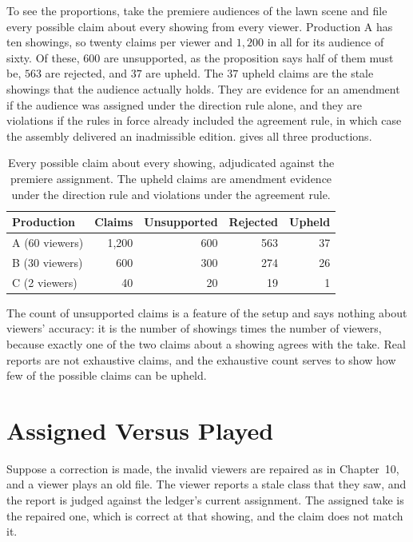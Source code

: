 \documentclass[11pt,twoside,openright]{book}
\theoremstyle{plain}
\theoremstyle{definition}
\theoremstyle{remark}
\begin{document}
To see the proportions, take the premiere audiences of the lawn scene and file every possible claim about every showing from every viewer. Production A has ten showings, so twenty claims per viewer and $1{,}200$ in all for its audience of sixty. Of these, $600$ are unsupported, as the proposition says half of them must be, $563$ are rejected, and $37$ are upheld. The $37$ upheld claims are the stale showings that the audience actually holds. They are evidence for an amendment if the audience was assigned under the direction rule alone, and they are violations if the rules in force already included the agreement rule, in which case the assembly delivered an inadmissible edition.  gives all three productions.

\begin{table}[ht]
\centering
\begin{tabular}{@{}lrrrr@{}}
\toprule
Production & Claims & Unsupported & Rejected & Upheld\\
\midrule
A (60 viewers) & 1,200 & 600 & 563 & 37\\
B (30 viewers) & 600 & 300 & 274 & 26\\
C (2 viewers) & 40 & 20 & 19 & 1\\
\bottomrule
\end{tabular}
\caption{Every possible claim about every showing, adjudicated against the premiere assignment. The upheld claims are amendment evidence under the direction rule and violations under the agreement rule.}\label{tab:verdicts}
\end{table}

The count of unsupported claims is a feature of the setup and says nothing about viewers' accuracy: it is the number of showings times the number of viewers, because exactly one of the two claims about a showing agrees with the take. Real reports are not exhaustive claims, and the exhaustive count serves to show how few of the possible claims can be upheld.

\section{Assigned Versus Played}\label{sec:played}

Suppose a correction is made, the invalid viewers are repaired as in Chapter~10, and a viewer plays an old file. The viewer reports a stale class that they saw, and the report is judged against the ledger's current assignment. The assigned take is the repaired one, which is correct at that showing, and the claim does not match it.
\end{document}
